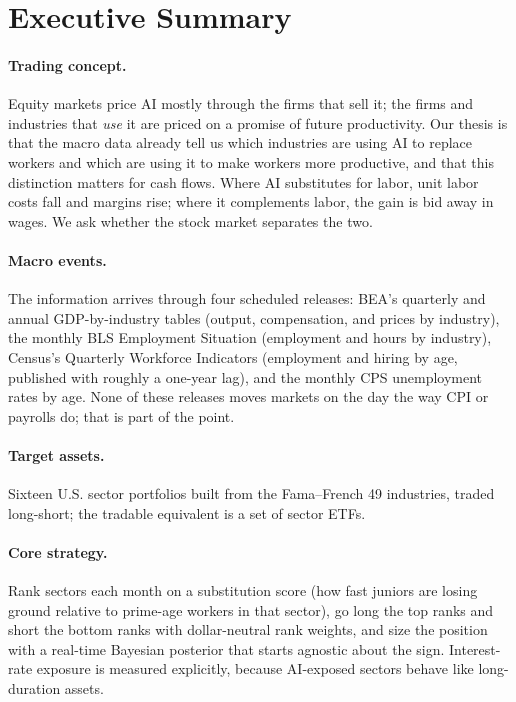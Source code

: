 \section{Executive Summary}
\label{sec:summary}

\paragraph{Trading concept.} Equity markets price AI mostly through the firms that sell it; the firms and industries that \emph{use} it are priced on a promise of future productivity. Our thesis is that the macro data already tell us which industries are using AI to replace workers and which are using it to make workers more productive, and that this distinction matters for cash flows. Where AI substitutes for labor, unit labor costs fall and margins rise; where it complements labor, the gain is bid away in wages. We ask whether the stock market separates the two.

\paragraph{Macro events.} The information arrives through four scheduled releases: BEA's quarterly and annual GDP-by-industry tables (output, compensation, and prices by industry), the monthly BLS Employment Situation (employment and hours by industry), Census's Quarterly Workforce Indicators (employment and hiring by age, published with roughly a one-year lag), and the monthly CPS unemployment rates by age. None of these releases moves markets on the day the way CPI or payrolls do; that is part of the point.

\paragraph{Target assets.} Sixteen U.S. sector portfolios built from the Fama--French 49 industries, traded long-short; the tradable equivalent is a set of sector ETFs.

\paragraph{Core strategy.} Rank sectors each month on a substitution score (how fast juniors are losing ground relative to prime-age workers in that sector), go long the top ranks and short the bottom ranks with dollar-neutral rank weights, and size the position with a real-time Bayesian posterior that starts agnostic about the sign. Interest-rate exposure is measured explicitly, because AI-exposed sectors behave like long-duration assets.

